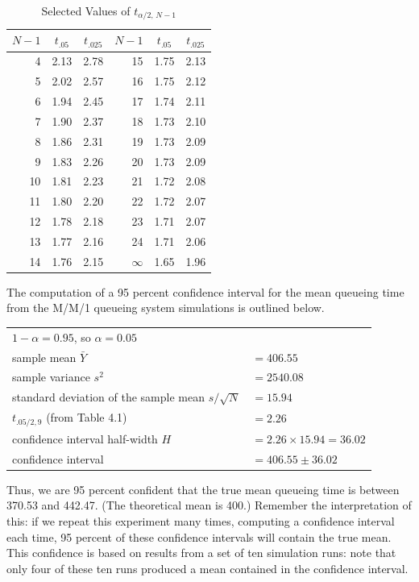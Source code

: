 \begin{table}[H]
\centering
\begin{tabular}{rcc rcc}
\toprule
\multicolumn{1}{c}{$N-1$} & $t_{.05}$ & $t_{.025}$ &
\multicolumn{1}{c}{$N-1$} & $t_{.05}$ & $t_{.025}$ \\
\midrule
4  & 2.13 & 2.78 & 15 & 1.75 & 2.13 \\
5  & 2.02 & 2.57 & 16 & 1.75 & 2.12 \\
6  & 1.94 & 2.45 & 17 & 1.74 & 2.11 \\
7  & 1.90 & 2.37 & 18 & 1.73 & 2.10 \\
8  & 1.86 & 2.31 & 19 & 1.73 & 2.09 \\
9  & 1.83 & 2.26 & 20 & 1.73 & 2.09 \\
10 & 1.81 & 2.23 & 21 & 1.72 & 2.08 \\
11 & 1.80 & 2.20 & 22 & 1.72 & 2.07 \\
12 & 1.78 & 2.18 & 23 & 1.71 & 2.07 \\
13 & 1.77 & 2.16 & 24 & 1.71 & 2.06 \\
14 & 1.76 & 2.15 & $\infty$ & 1.65 & 1.96 \\
\bottomrule
\end{tabular}
\caption{Selected Values of $t_{\alpha/2,\,N-1}$}
\end{table}

The computation of a 95 percent confidence interval for the mean queueing time
from the M/M/1 queueing system simulations is outlined below.

\begin{center}
\begin{tabular}{ll}
$1-\alpha = 0.95$, so $\alpha = 0.05$ & \\
sample mean $\bar{Y}$ & $= 406.55$ \\
sample variance $s^2$ & $= 2540.08$ \\
standard deviation of the sample mean $s/\sqrt{N}$ & $= 15.94$ \\
$t_{.05/2,9}$ (from Table 4.1) & $= 2.26$ \\
confidence interval half-width $H$ & $= 2.26 \times 15.94 = 36.02$ \\
confidence interval & $= 406.55 \pm 36.02$ \\
\end{tabular}
\end{center}

Thus, we are 95 percent confident that the true mean queueing time is between
370.53 and 442.47. (The theoretical mean is 400.) Remember the interpretation
of this: if we repeat this experiment many times, computing a confidence
interval each time, 95 percent of these confidence intervals will contain the
true mean. This confidence is based on results from a set of ten simulation
runs: note that only four of these ten runs produced a mean contained in the
confidence interval.

